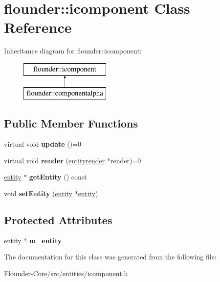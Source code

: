 \hypertarget{classflounder_1_1icomponent}{}\section{flounder\+:\+:icomponent Class Reference}
\label{classflounder_1_1icomponent}
Inheritance diagram for flounder\+:\+:icomponent\+:\begin{figure}[H]
\begin{center}
\leavevmode
\includegraphics[height=2.000000cm]{classflounder_1_1icomponent}
\end{center}
\end{figure}
\subsection*{Public Member Functions}
\begin{DoxyCompactItemize}
\item 
\mbox{\label{classflounder_1_1icomponent_af253f3dd7dea336348fe5b4f4da21d45}} 
virtual void {\bfseries update} ()=0
\item 
\mbox{\label{classflounder_1_1icomponent_a4edcb1b808fda7b1e85dd95eea3b656f}} 
virtual void {\bfseries render} (\hyperlink{structflounder_1_1entityrender}{entityrender} $\ast$render)=0
\item 
\mbox{\label{classflounder_1_1icomponent_aba3e4a5a9ffac336e13d0e3e0f89d6f7}} 
\hyperlink{classflounder_1_1entity}{entity} $\ast$ {\bfseries get\+Entity} () const
\item 
\mbox{\label{classflounder_1_1icomponent_a3b589cf519260b286a5a6d5514a26795}} 
void {\bfseries set\+Entity} (\hyperlink{classflounder_1_1entity}{entity} $\ast$\hyperlink{classflounder_1_1entity}{entity})
\end{DoxyCompactItemize}
\subsection*{Protected Attributes}
\begin{DoxyCompactItemize}
\item 
\mbox{\label{classflounder_1_1icomponent_af5e25b049a691b4600e2058823a31c15}} 
\hyperlink{classflounder_1_1entity}{entity} $\ast$ {\bfseries m\+\_\+entity}
\end{DoxyCompactItemize}


The documentation for this class was generated from the following file\+:\begin{DoxyCompactItemize}
\item 
Flounder-\/\+Core/src/entities/icomponent.\+h\end{DoxyCompactItemize}
